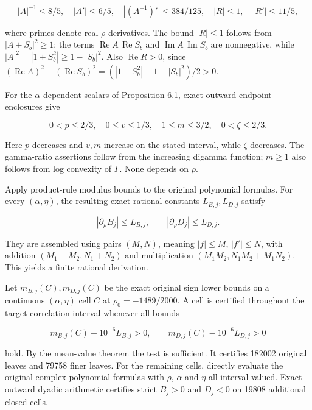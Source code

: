 \documentclass[11pt,a4paper]{article}
\begin{document}
\begin{equation*}\tag{B.16}
|A|^{-1}\le8/5,\quad |A'|\le6/5,\quad
|(A^{-1})'|\le384/125,\quad |R|\le1,\quad |R'|\le11/5,
\end{equation*}

\noindent where primes denote real \(\rho\) derivatives. The bound \(|R|\le1\) follows from \(|A+S_b|^2\ge1\): the terms \(\operatorname{Re} A\,\operatorname{Re} S_b\) and \(\operatorname{Im} A\,\operatorname{Im} S_b\) are nonnegative, while \(|A|^2=|1+S_b^2|\ge1-|S_b|^2\). Also \(\operatorname{Re} R>0\), since \((\operatorname{Re} A)^2-(\operatorname{Re} S_b)^2=(|1+S_b^2|+1-|S_b|^2)/2>0\).

For the \(\alpha\)-dependent scalars of Proposition 6.1, exact outward endpoint enclosures give

\begin{equation*}\tag{B.17}
0<p\le2/3,\quad0\le v\le1/3,\quad
1\le m\le3/2,\quad0<\zeta\le2/3.
\end{equation*}

Here \(p\) decreases and \(v,m\) increase on the stated interval, while \(\zeta\) decreases. The gamma-ratio assertions follow from the increasing digamma function; \(m\ge1\) also follows from log convexity of \(\Gamma\). None depends on \(\rho\).

Apply product-rule modulus bounds to the original polynomial formulas. For every \((\alpha,\eta)\), the resulting exact rational constants \(L_{B,j},L_{D,j}\) satisfy

\begin{equation*}\tag{B.18}
|\partial_\rho B_j|\le L_{B,j},\qquad
|\partial_\rho D_j|\le L_{D,j}.
\end{equation*}

They are assembled using pairs \((M,N)\), meaning \(|f|\le M\), \(|f'|\le N\), with addition \((M_1+M_2,N_1+N_2)\) and multiplication \((M_1M_2,N_1M_2+M_1N_2)\). This yields a finite rational derivation.

Let \(m_{B,j}(C),m_{D,j}(C)\) be the exact original sign lower bounds on a continuous \((\alpha,\eta)\) cell \(C\) at \(\rho_0=-1489/2000\). A cell is certified throughout the target correlation interval whenever all bounds

\begin{equation*}\tag{B.19}
m_{B,j}(C)-10^{-6}L_{B,j}>0,\qquad
m_{D,j}(C)-10^{-6}L_{D,j}>0
\end{equation*}

\noindent hold. By the mean-value theorem the test is sufficient. It certifies 182002 original leaves and 79758 finer leaves. For the remaining cells, directly evaluate the original complex polynomial formulas with \(\rho\), \(\alpha\) and \(\eta\) all interval valued. Exact outward dyadic arithmetic certifies strict \(B_j>0\) and \(D_j<0\) on 19808 additional closed cells.
\end{document}
